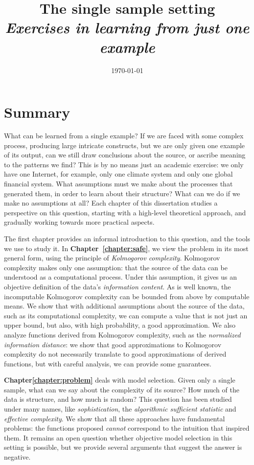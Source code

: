 \documentclass{thesis}
\title{The single sample setting \\ \normalsize \emph{Exercises in learning from just one example}}
\date{\today}
\theoremstyle{definition}
\begin{document}
\maketitle

\tableofcontents

\chapter*{Summary}
\noindent What can be learned from a single example? If we are faced with some complex process, producing large intricate constructs, but we are only given one example of its output, can we still draw conclusions about the source, or ascribe meaning to the patterns we find? This is by no means just an academic exercise: we only have one Internet, for example, only one climate system and only one global financial system. What assumptions must we make about the processes that generated them, in order to learn about their structure? What can we do if we make no assumptions at all? Each chapter of this dissertation studies a perspective on this question, starting with a high-level theoretical approach, and gradually working towards more practical aspects.
 
The first chapter provides an informal introduction to this question, and the tools we use to study it. In \textbf{Chapter~\ref{chapter:safe}}, we view the problem in its most general form, using the principle of \emph{Kolmogorov complexity}. Kolmogorov complexity makes only one assumption: that the source of the data can be understood as a computational process. Under this assumption, it gives us an objective definition of the data's \emph{information content}. As is well known, the incomputable Kolmogorov complexity can be bounded from above by computable means. We show that with additional assumptions about the source of the data, such as its computational complexity, we can compute a value that is not just an upper bound, but also, with high probability, a good approximation. We also analyze functions derived from Kolmogorov complexity, such as the \emph{normalized information distance}: we show that good approximations to Kolmogorov complexity do not necessarily translate to good approximations of derived functions, but with careful analysis, we can provide some guarantees.

\textbf{Chapter\ref{chapter:problem}} deals with model selection. Given only a single sample, what can we say about the complexity of its source? How much of the data is structure, and how much is random? This question has been studied under many names, like \emph{sophistication}, the \emph{algorithmic sufficient statistic} and  \emph{effective complexity}. We show that all these approaches have fundamental problems: the functions proposed \emph{cannot} correspond to the intuition that inspired them. It remains an open question whether objective model selection in this setting is possible, but we provide several arguments that suggest the answer is negative.
\end{document}
